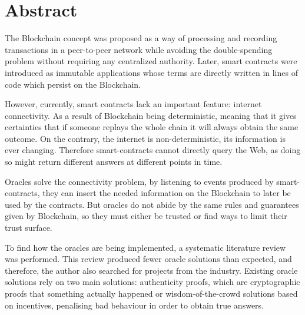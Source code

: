 \chapter*{Abstract}

The Blockchain concept was proposed as a way of processing and recording transactions in a peer-to-peer network while avoiding the double-spending problem without requiring any centralized authority. Later, smart contracts were introduced as immutable applications whose terms are directly written in lines of code which persist on the Blockchain.

However, currently, smart contracts lack an important feature: internet connectivity. As a result of Blockchain being deterministic, meaning that it gives certainties that if someone replays the whole chain it will always obtain the same outcome. On the contrary, the internet is non-deterministic, its information is ever changing. Therefore smart-contracts cannot directly query the Web, as doing so might return different answers at different points in time.

Oracles solve the connectivity problem, by listening to events produced by smart-contracts, they can insert the needed information on the Blockchain to later be used by the contracts. But oracles do not abide by the same rules and guarantees given by Blockchain, so they must either be trusted or find ways to limit their trust surface.

To find how the oracles are being implemented, a systematic literature review was performed. This review produced fewer oracle solutions than expected, and therefore, the author also searched for projects from the industry. Existing oracle solutions rely on two main solutions: authenticity proofs, which are cryptographic proofs that something actually happened or wisdom-of-the-crowd solutions based on incentives, penalising bad behaviour in order to obtain true answers.



